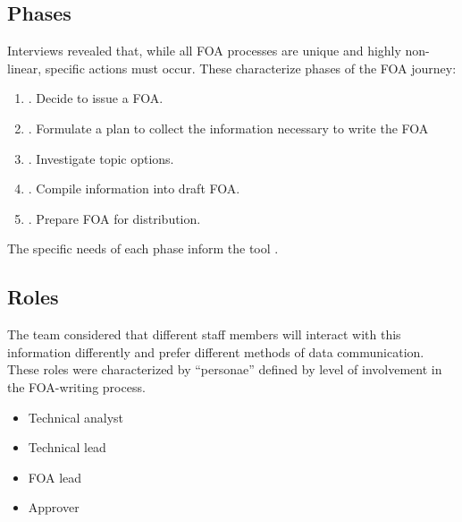 \documentclass[letterpaper,10pt,english]{sphinxmanual}
\begin{document}
\subsection{Phases}
\label{\detokenize{doc-src/mock-foa:phases}}
Interviews revealed that, while all FOA processes are unique and highly
non-linear, specific actions must occur. These characterize phases of
the FOA journey:
\begin{enumerate}
\def\theenumi{\arabic{enumi}}
\def\labelenumi{\theenumi .}
\makeatletter\def\p@enumii{\p@enumi \theenumi .}\makeatother
\item {} 
. Decide to issue a FOA.

\item {} 
. Formulate a plan to collect the information necessary to write the FOA

\item {} 
. Investigate topic options.

\item {} 
. Compile information into draft FOA.

\item {} 
. Prepare FOA for distribution.

\end{enumerate}

The specific needs of each phase inform the tool .


\subsection{Roles}
\label{\detokenize{doc-src/mock-foa:roles}}
The team considered that different staff members will interact with this
information differently and prefer different methods of data
communication. These roles were characterized by “personae” defined by
level of involvement in the FOA-writing process.
\begin{itemize}
\item {} 
Technical analyst

\item {} 
Technical lead

\item {} 
FOA lead

\item {} 
Approver

\end{itemize}
\end{document}
